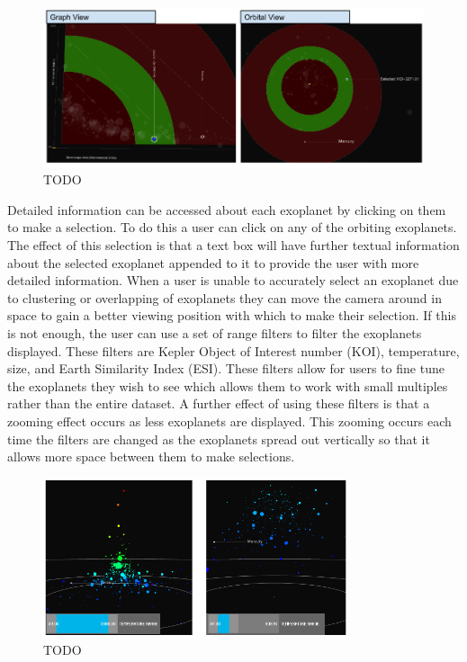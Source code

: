 \begin{figure}[H]
  \centering
      \includegraphics[width=1\textwidth]{images/habitable.png}
  \caption{TODO~}  
    \label{fig:habitable}
\end{figure}

Detailed information can be accessed about each exoplanet by clicking on them to
make a selection. To do this a user can click on any of the orbiting exoplanets.
The effect of this selection is that a text box will have further textual
information about the selected exoplanet appended to it to provide the user with
more detailed information. When a user is unable to accurately select an
exoplanet due to clustering or
overlapping of exoplanets they can move the camera around in space to gain a
better viewing position with which to make their selection. If this is not
enough, the user can use a set of range filters to filter the exoplanets
displayed. These filters are Kepler Object of Interest number (KOI),
temperature, size, and Earth Similarity Index (ESI). These filters allow for
users to fine tune the exoplanets they wish to see which allows them to work
with small multiples rather than the entire dataset. A further effect of using these filters is that a zooming effect occurs as less exoplanets are displayed. This zooming occurs each time the filters are changed as the exoplanets spread out vertically so that it allows more space between them to make selections.

\begin{figure}[H]
  \centering
      \includegraphics[width=0.8\textwidth]{images/zoomFilter.png}
  \caption{TODO~}  
    \label{fig:zoomFilter}
\end{figure}

